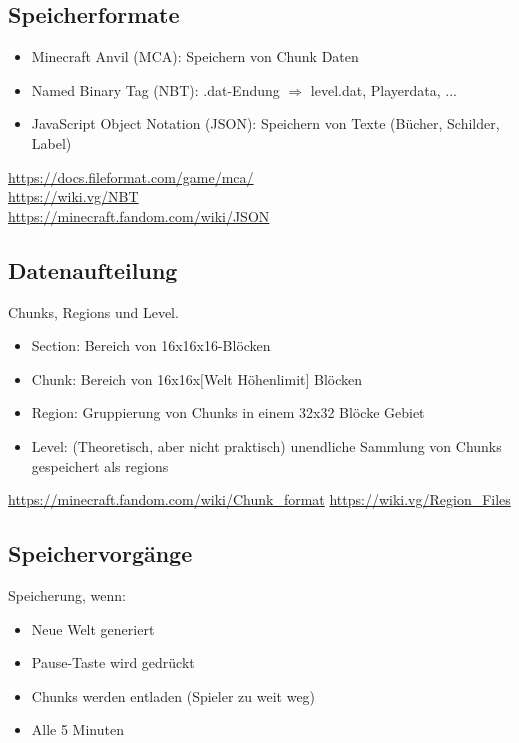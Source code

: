 \subsection{Speicherformate}
\begin{itemize}
    \item Minecraft Anvil (MCA): Speichern von Chunk Daten
    \item Named Binary Tag (NBT): .dat-Endung $\Rightarrow$ level.dat, Playerdata, ... 
    \item JavaScript Object Notation (JSON): Speichern von Texte (Bücher, Schilder, Label)
\end{itemize}

\url{https://docs.fileformat.com/game/mca/}\\
\url{https://wiki.vg/NBT}\\
\url{https://minecraft.fandom.com/wiki/JSON}

\subsection{Datenaufteilung}
Chunks, Regions und Level. 

\begin{itemize}
    \item Section: Bereich von 16x16x16-Blöcken
    \item Chunk: Bereich von 16x16x$[$Welt Höhenlimit$]$ Blöcken
    \item Region: Gruppierung von Chunks in einem 32x32 Blöcke Gebiet
    \item Level: (Theoretisch, aber nicht praktisch) unendliche Sammlung von Chunks gespeichert als regions
\end{itemize}

\url{https://minecraft.fandom.com/wiki/Chunk_format}
\url{https://wiki.vg/Region_Files}

\subsection{Speichervorgänge}

Speicherung, wenn:
\begin{itemize}
    \item Neue Welt generiert
    \item Pause-Taste wird gedrückt
    \item Chunks werden entladen (Spieler zu weit weg)
    \item Alle 5 Minuten
\end{itemize}

